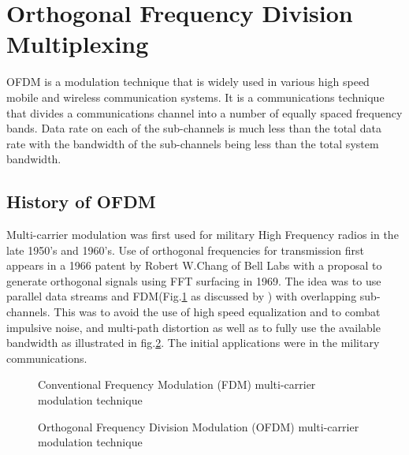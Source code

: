 

\section{Orthogonal Frequency Division Multiplexing}
\gls{OFDM} is a modulation technique that is widely used in various high speed mobile and wireless communication systems. It is a communications technique that divides a communications channel into a number of equally spaced frequency bands. Data rate on each of the sub-channels is much less than the total data rate with the bandwidth of the sub-channels being less than the total system bandwidth. 


\subsection{History of OFDM}
Multi-carrier modulation was first used for military High Frequency radios in the late 1950's and 1960's. Use of orthogonal frequencies for transmission first appears in a 1966 patent by Robert W.Chang of Bell Labs with a proposal to generate orthogonal signals using \gls{FFT} surfacing in 1969. The idea was to use parallel data streams and \gls{FDM}(Fig.\ref{Conv_fdm} as discussed by \cite{ofdm_intro}) with overlapping sub-channels. This was to avoid the use of high speed equalization and to combat impulsive noise, and multi-path distortion as well as to fully use the available bandwidth as illustrated in fig.\ref{Conv_ofdm}\cite{ofdm_intro}. The initial applications were in the military communications.

\begin{figure}[h!]
	\centerline{\resizebox{10cm}{!}{}}
	
	\caption{Conventional Frequency Modulation (FDM) multi-carrier modulation technique}
	\label{Conv_fdm}
\end{figure}

\begin{figure}[h!]
	\centerline{\resizebox{10cm}{!}{}}
	
	\caption{Orthogonal Frequency Division Modulation (OFDM) multi-carrier modulation technique}
	\label{Conv_ofdm}
\end{figure}


